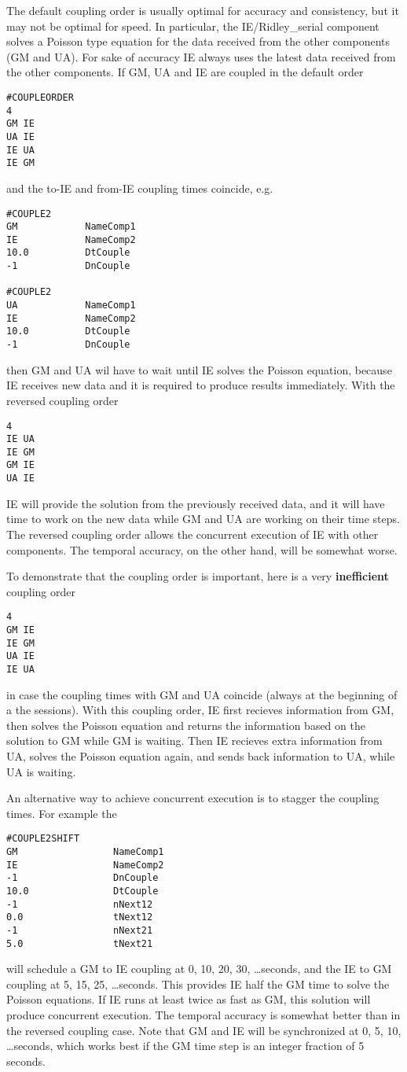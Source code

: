 The default coupling order is usually optimal for accuracy
and consistency, but it may not be optimal for speed.
In particular, the IE/Ridley\_serial component solves
a Poisson type equation for the data received from the 
other components (GM and UA). For sake of accuracy
IE always uses the latest data received from the other
components. If GM, UA and IE are coupled
in the default order
\begin{verbatim}
#COUPLEORDER
4
GM IE
UA IE
IE UA
IE GM
\end{verbatim}
and the to-IE and from-IE coupling times coincide, e.g.
\begin{verbatim}
#COUPLE2
GM            NameComp1
IE            NameComp2
10.0          DtCouple
-1            DnCouple

#COUPLE2
UA            NameComp1
IE            NameComp2
10.0          DtCouple
-1            DnCouple
\end{verbatim}
then GM and UA wil have to wait until IE solves
the Poisson equation, because IE receives new data
and it is required to produce results immediately.
With the reversed coupling order
\begin{verbatim}
4
IE UA
IE GM
GM IE
UA IE
\end{verbatim}
IE will provide the solution from the previously received data,
and it will have time to work on the new data while GM and UA
are working on their time steps. The reversed coupling order
allows the concurrent execution of IE with other components.
The temporal accuracy, on the other hand, will be somewhat worse.

To demonstrate that the coupling order is important, here
is a very {\bf inefficient} coupling order
\begin{verbatim}
4
GM IE
IE GM
UA IE
IE UA
\end{verbatim}
in case the coupling times with GM and UA coincide (always at the beginning
of a the sessions).
With this coupling order, IE first recieves information from GM,
then solves the Poisson equation and returns the information based
on the solution to GM while GM is waiting. Then IE recieves extra
information from UA, solves the Poisson equation again, and sends
back information to UA, while UA is waiting. 

An alternative way to achieve concurrent execution is to
stagger the coupling times. For example the
\begin{verbatim}
#COUPLE2SHIFT
GM                 NameComp1
IE                 NameComp2
-1                 DnCouple
10.0               DtCouple
-1                 nNext12
0.0                tNext12
-1                 nNext21
5.0                tNext21
\end{verbatim}
will schedule a GM to IE coupling at 0, 10, 20, 30, \ldots seconds,
and the IE to GM coupling at 5, 15, 25, \ldots seconds.
This provides IE half the GM time to solve the Poisson equations.
If IE runs at least twice as fast as GM, this solution will
produce concurrent execution. The temporal accuracy is
somewhat better than in the reversed coupling case.
Note that GM and IE will be synchronized at 0, 5, 10, \ldots seconds,
which works best if the GM time step is an integer fraction of 5 seconds.
